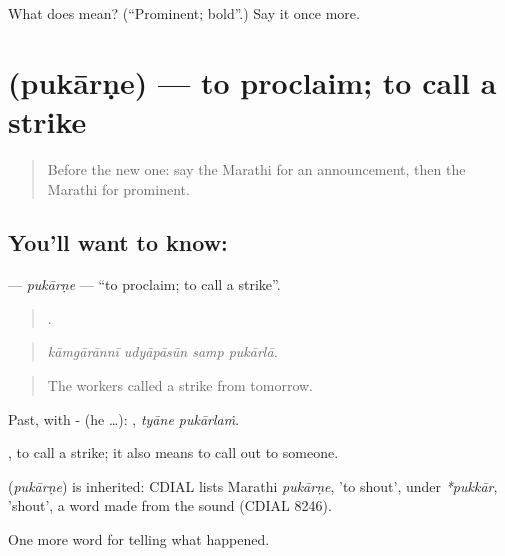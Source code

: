 \begin{tcolorbox}[breakable,colback=teal!4,colframe=teal!35!black,title={Before you move on}]
What does  mean? (\textquotedblleft{}Prominent; bold\textquotedblright{}.) Say it once more.
\end{tcolorbox}
\section[\texorpdfstring{\mr{पुकारणे} (pukārṇe)}{पुकारणे (pukārṇe)}]{ (pukārṇe) — to proclaim; to call a strike}

\label{lesson:MR-C313-pukarne}



\begin{quote}
Before the new one: say the Marathi for an announcement, then the Marathi for prominent.
\end{quote}

\subsection*{You'll want to know: }
\textbf{} — \emph{pukārṇe} — \textquotedblleft{}to proclaim; to call a strike\textquotedblright{}.

\begin{quote}
   .
\end{quote}

\begin{quote}
\emph{kāmgārānnī udyāpāsūn samp pukārlā.}
\end{quote}

\begin{quote}
The workers called a strike from tomorrow.
\end{quote}

Past, with - (he …):  , \emph{tyāne pukārlaṁ}.

 , to call a strike; it also means to call out to someone.

\begin{cousinweb}
\textbf{} (\emph{pukārṇe}) is inherited: CDIAL lists Marathi \emph{pukārṇe}, 'to shout', under \emph{*pukkār}, 'shout', a word made from the sound (CDIAL 8246).
\end{cousinweb}

\begin{grammarlens}[title={What you've built}]
One more word for telling what happened.
\end{grammarlens}


